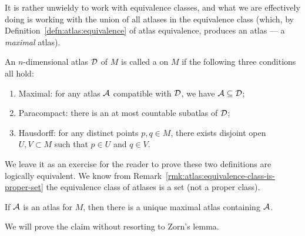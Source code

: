 \begin{remark}
It is rather unwieldy to work with equivalence classes, and what we are
effectively doing is working with the union of all atlases in the
equivalence class (which, by Definition~\ref{defn:atlas:equivalence}
of atlas equivalence, produces an atlas --- a \emph{maximal} atlas).
\end{remark}

\begin{definition}\label{defn:manifold:atlas-version}
An $n$-dimensional atlas $\mathcal{D}$ of $M$ is called a 
on $M$ if the following three conditions all hold:
\begin{enumerate}
\item Maximal: for any atlas $\mathcal{A}$ compatible with $\mathcal{D}$, we
  have $\mathcal{A}\subseteq\mathcal{D}$;
\item Paracompact: there is an at most countable subatlas of $\mathcal{D}$;
\item Hausdorff: for any distinct points $p,q\in M$, there exists
  disjoint open $U,V\subset M$ such that $p\in U$ and $q\in V$.
\end{enumerate}
\end{definition}

\begin{remark}
We leave it as an exercise for the reader to prove these two definitions
are logically equivalent. We know from Remark~\ref{rmk:atlas:equivalence-class-is-proper-set}
the equivalence class of atlases is a set (not a proper class).
\end{remark}

\begin{theorem}\label{thm:atlas:contained-in-unique-maximal-atlas}
If $\mathcal{A}$ is an atlas for $M$,
then there is a unique maximal atlas containing $\mathcal{A}$.
\end{theorem}

We will prove the claim without resorting to Zorn's lemma.

